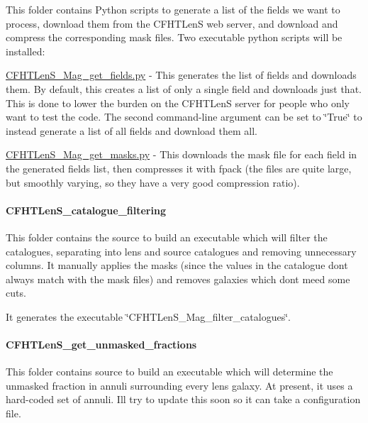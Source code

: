 This folder contains Python scripts to generate a list of the fields we want to process, download them from the C\+F\+H\+T\+Len\+S web server, and download and compress the corresponding mask files. Two executable python scripts will be installed\+:


\begin{DoxyItemize}
\item \hyperlink{CFHTLenS__Mag__get__fields_8py}{C\+F\+H\+T\+Len\+S\+\_\+\+Mag\+\_\+get\+\_\+fields.\+py} -\/ This generates the list of fields and downloads them. By default, this creates a list of only a single field and downloads just that. This is done to lower the burden on the C\+F\+H\+T\+Len\+S server for people who only want to test the code. The second command-\/line argument can be set to \char`\"{}\+True\char`\"{} to instead generate a list of all fields and download them all.
\item \hyperlink{CFHTLenS__Mag__get__masks_8py}{C\+F\+H\+T\+Len\+S\+\_\+\+Mag\+\_\+get\+\_\+masks.\+py} -\/ This downloads the mask file for each field in the generated fields list, then compresses it with fpack (the files are quite large, but smoothly varying, so they have a very good compression ratio).
\end{DoxyItemize}

\paragraph*{C\+F\+H\+T\+Len\+S\+\_\+catalogue\+\_\+filtering}

This folder contains the source to build an executable which will filter the catalogues, separating into lens and source catalogues and removing unnecessary columns. It manually applies the masks (since the values in the catalogue don\textquotesingle{}t always match with the mask files) and removes galaxies which don\textquotesingle{}t meed some cuts.

It generates the executable \char`\"{}\+C\+F\+H\+T\+Len\+S\+\_\+\+Mag\+\_\+filter\+\_\+catalogues\char`\"{}.

\paragraph*{C\+F\+H\+T\+Len\+S\+\_\+get\+\_\+unmasked\+\_\+fractions}

This folder contains source to build an executable which will determine the unmasked fraction in annuli surrounding every lens galaxy. At present, it uses a hard-\/coded set of annuli. I\textquotesingle{}ll try to update this soon so it can take a configuration file.

